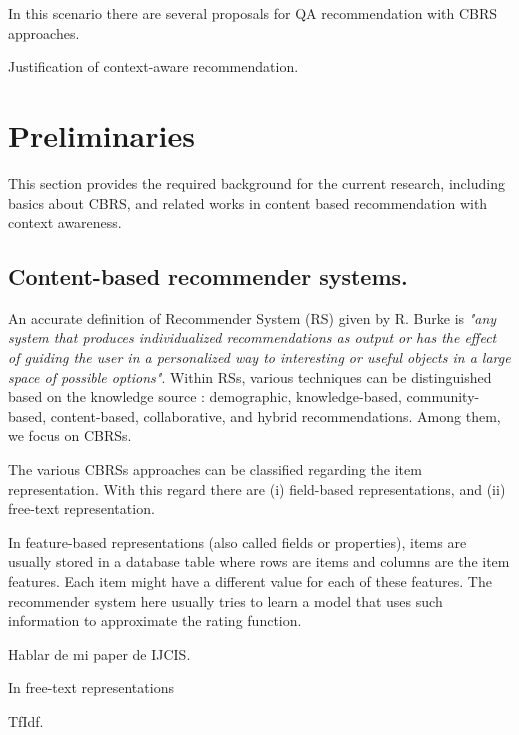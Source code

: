 \documentclass[preprint]{elsarticle}
\begin{document}
\begin{spacing}{2}
In this scenario there are several proposals for QA recommendation with CBRS approaches. 




Justification of context-aware recommendation.





\section{Preliminaries}

This section provides the required background for the current research, including basics about CBRS, and related works in content based recommendation with context awareness.

\subsection{Content-based recommender systems.}

An accurate definition of Recommender System (RS) given by R. Burke \cite{Burke2002} is \emph{"any system that produces individualized recommendations as output or has the effect of guiding the user in a personalized way to interesting or useful objects in a large space of possible options"}. Within RSs, various techniques can be distinguished based on the knowledge source \cite{DePessemier2016}: demographic, knowledge-based, community-based, content-based, collaborative, and hybrid recommendations. Among them, we focus on CBRSs.

The various CBRSs approaches can be classified regarding the item representation. With this regard there are (i) field-based representations, and (ii) free-text representation. 

In feature-based representations (also called fields or properties), items are usually stored in a database table where rows are items and columns are the item features. Each item might have a different value for each of these features. The recommender system here usually tries to learn a model that uses such information to approximate the rating function.

Hablar de mi paper de IJCIS.


In free-text representations

TfIdf.


\end{spacing}
\end{document}
